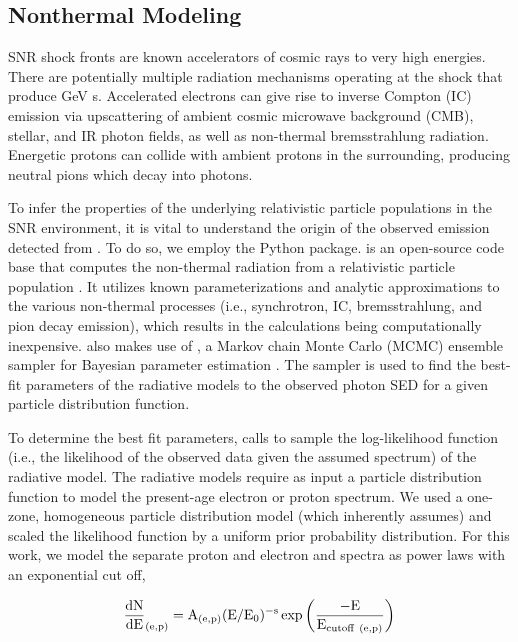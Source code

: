 \subsection{Nonthermal Modeling}\label{G150:naima}


SNR shock fronts are known accelerators of cosmic rays to very high energies. There are potentially multiple radiation mechanisms operating at the shock that produce GeV \gam{}s. Accelerated electrons can give rise to inverse Compton (IC) emission via upscattering of ambient cosmic microwave background (CMB), stellar, and IR photon fields, as well as non-thermal bremsstrahlung radiation. Energetic protons can collide with ambient protons in the surrounding, producing neutral pions which decay into \gam{} photons. 

To infer the properties of the underlying relativistic particle populations in the SNR environment, it is vital to understand the origin of the observed \gam{} emission detected from  \Gone{}. To do so, we employ the \nai{} Python package. \nai{} is an open-source code base that computes the non-thermal radiation from a relativistic particle population \citep{Zabalza15}. It utilizes known parameterizations and analytic approximations to the various non-thermal processes (i.e., synchrotron, IC, bremsstrahlung, and pion decay emission), which results in the calculations being computationally inexpensive. \nai{} also makes use of \emc{}, a Markov chain Monte Carlo (MCMC) ensemble sampler for Bayesian parameter estimation \citep{Foreman13}. The sampler is used to find the best-fit parameters of the radiative models to the observed photon SED for a given particle distribution function. 

To determine the best fit parameters, \nai{} calls \emc{} to sample the log-likelihood function (i.e., the likelihood of the observed data given the assumed spectrum) of the radiative model. The radiative models require as input a particle distribution function to model the present-age electron or proton spectrum. We used a one-zone, homogeneous particle distribution model (which \nai{} inherently assumes) and scaled the likelihood function by a uniform prior probability distribution. For this work, we model the separate proton and electron and spectra as power laws with an exponential cut off,

\begin{equation}\label{eq:ecpl}
	{\rm \frac{dN}{dE}_{(e,p)} = A_{(e,p)} (E / E_0) ^{-s} \exp {\bigg ( }\frac{- E}{ E_{cutoff~(e,p)}}{\bigg)}}
\end{equation}


